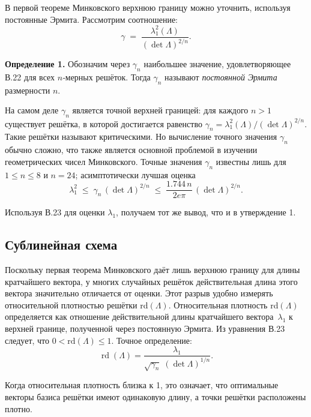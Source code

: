 В первой теореме Минковского верхнюю границу можно уточнить, используя
постоянные Эрмита. Рассмотрим соотношение:
\begin{equation}
\gamma \;=\;
\frac{\lambda_{1}^{2}(\Lambda)}{(\det\Lambda)^{2/n}}.
\end{equation}

\textbf{Определение 1.} Обозначим через $\gamma_{n}$ наибольшее значение,
удовлетворяющее В.22 для всех $n$‑мерных решёток. Тогда $\gamma_{n}$ называют
\textit{постоянной Эрмита} размерности $n$.

На самом деле $\gamma_{n}$ является точной верхней границей: для каждого $n>1$
существует решётка, в которой достигается равенство
$\gamma_{n}=\lambda_{1}^{2}(\Lambda)/(\det\Lambda)^{2/n}$. Такие решётки
называют критическими. Но вычисление точного значения $\gamma_{n}$ обычно
сложно, что также является основной проблемой в изучении геометрических чисел
Минковского. Точные значения $\gamma_{n}$ известны лишь для $1\le n\le8$ и
$n=24$; асимптотически лучшая оценка \cite{cite_43}
\begin{equation}
\lambda_{1}^{2}
\;\le\;
\gamma_{n}\,(\det\Lambda)^{2/n}
\;\le\;
\frac{1.744\,n}{2e\pi}\,(\det\Lambda)^{2/n}.
\end{equation}

Используя В.23 для оценки $\lambda_{1}$, получаем тот же вывод, что и в
утверждение 1.

\subsection*{Сублинейная схема}

Поскольку первая теорема Минковского даёт лишь верхнюю границу для длины
кратчайшего вектора, у многих случайных решёток действительная длина этого
вектора значительно отличается от оценки. Этот разрыв удобно измерять
относительной плотностью решётки rd$(\Lambda)$. Относительная плотность
rd$(\Lambda)$ определяется как отношение действительной длины кратчайшего
вектора $\lambda_{1}$ к верхней границе, полученной через постоянную Эрмита. Из
уравнения В.23 следует, что $0<\text{rd}(\Lambda)\le1$. Точное определение:
\begin{equation}
\operatorname{rd}(\Lambda)
  = \frac{\lambda_{1}}{\sqrt{\gamma_{n}}\;(\det\Lambda)^{1/n}}.
\end{equation}

Когда относительная плотность близка к 1, это означает, что оптимальные векторы
базиса решётки имеют одинаковую длину, а точки решётки расположены плотно.

